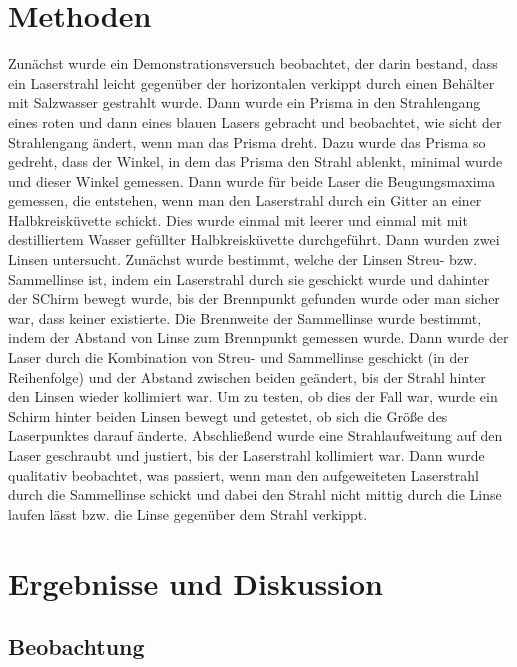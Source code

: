\documentclass[
	a4paper,
	12pt,
	pagesize,
	ngerman
]{scrartcl}
\begin{document}
	\section{Methoden}
	Zunächst wurde ein Demonstrationsversuch beobachtet, der darin bestand, dass ein Laserstrahl leicht gegenüber der horizontalen verkippt durch einen Behälter mit Salzwasser gestrahlt wurde.
	Dann wurde ein Prisma in den Strahlengang eines roten und dann eines blauen Lasers gebracht und beobachtet, wie sicht der Strahlengang ändert, wenn man das Prisma dreht.
	Dazu wurde das Prisma so gedreht, dass der Winkel, in dem das Prisma den Strahl ablenkt, minimal wurde und dieser Winkel gemessen.
	Dann wurde für beide Laser die Beugungsmaxima gemessen, die entstehen, wenn man den Laserstrahl durch ein Gitter an einer Halbkreisküvette schickt.
	Dies wurde einmal mit leerer und einmal mit mit destilliertem Wasser gefüllter Halbkreisküvette durchgeführt.
	Dann wurden zwei Linsen untersucht.
	Zunächst wurde bestimmt, welche der Linsen Streu- bzw. Sammellinse ist, indem ein Laserstrahl durch sie geschickt wurde und dahinter der SChirm bewegt wurde, bis der Brennpunkt gefunden wurde oder man sicher war, dass keiner existierte. %
	Die Brennweite der Sammellinse wurde bestimmt, indem der Abstand von Linse zum Brennpunkt gemessen wurde.
	Dann wurde der Laser durch die Kombination von Streu- und Sammellinse geschickt (in der Reihenfolge) und der Abstand zwischen beiden geändert, bis der Strahl hinter den Linsen wieder kollimiert war.
	Um zu testen, ob dies der Fall war, wurde ein Schirm hinter beiden Linsen bewegt und getestet, ob sich die Größe des Laserpunktes darauf änderte.
	Abschließend wurde eine Strahlaufweitung auf den Laser geschraubt und justiert, bis der Laserstrahl kollimiert war.
	Dann wurde qualitativ beobachtet, was passiert, wenn man den aufgeweiteten Laserstrahl durch die Sammellinse schickt und dabei den Strahl nicht mittig durch die Linse laufen lässt bzw. die Linse gegenüber dem Strahl verkippt.
	
	\section{Ergebnisse und Diskussion}
	

	\subsection{Beobachtung}
\end{document}
